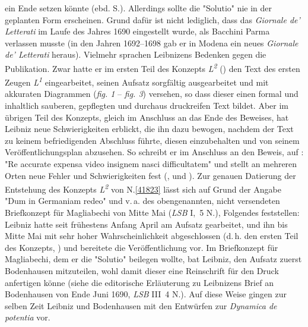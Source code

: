 \begin{ledgroup}
ein Ende setzen könnte
(ebd. S.).
\pend
\pstart
{}
Allerdings sollte die "Solutio" nie in der geplanten Form erscheinen.
Grund dafür ist nicht lediglich, dass das \cite{02102}\textit{Giornale de' Letterati} im Laufe des Jahres 1690 eingestellt wurde, als  Bacchini Parma verlassen musste (in den Jahren 1692--1698 gab er in Modena ein neues \cite{02103}\textit{Giornale de' Letterati} heraus).
Vielmehr sprachen Leibnizens Bedenken gegen die Publikation.
Zwar hatte er im ersten Teil des Konzepts \textit{L\textsuperscript{2}} () den Text des ersten Zeugen \textit{L\textsuperscript{1}} eingearbeitet, seinen Aufsatz sorgfältig ausgearbeitet und mit akkuraten Diagrammen (\textit{fig. 1} -- \textit{fig. 3}) versehen, so dass dieser einen formal und inhaltlich sauberen, gepflegten und durchaus druckreifen Text bildet.
Aber im übrigen Teil des Konzepts, gleich im Anschluss an das Ende des Beweises, hat Leibniz neue Schwierigkeiten erblickt, die ihn dazu bewogen, nachdem der Text zu keinem befriedigenden Abschluss führte, diesen einzubehalten und von seinem Veröffentlichungsplan abzusehen.
So schreibt er im Anschluss an den Beweis, auf : "Re accurate expensa video insignem nasci difficultatem" und stellt an mehreren Orten neue Fehler und Schwierigkeiten fest (,  und  ).
\pend
\pstart
Zur genauen Datierung der Entstehung des Konzepts \textit{L\textsuperscript{2}} von N.\;\ref{41823} lässt sich auf Grund der Angabe "Dum in Germaniam redeo" und v.\,a. des obengenannten, nicht versendeten Briefkonzept für Magliabechi von Mitte Mai (\textit{LSB} I,~5 N.), Folgendes feststellen:
Leibniz hatte seit frühestens Anfang April am Aufsatz gearbeitet, und ihn bis Mitte Mai mit sehr hoher Wahrscheinlichkeit abgeschlossen (d.\,h. den ersten Teil des Konzepts, ) und bereitete die Veröffentlichung vor. 
Im Briefkonzept für Magliabechi, dem er die "Solutio" beilegen wollte, bat Leibniz, den Aufsatz zuerst Bodenhausen mitzuteilen, wohl damit dieser eine Reinschrift für den Druck anfertigen könne (siehe die editorische Erläuterung zu Leibnizens \cite{02163}Brief an Bodenhausen von Ende Juni 1690, \textit{LSB} III~4 N.). Auf diese Weise gingen zur selben Zeit Leibniz und Bodenhausen mit den Entwürfen zur \cite{01354}\textit{Dynamica de potentia} vor.

\end{ledgroup}
